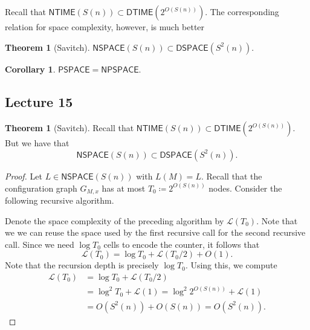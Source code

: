 \documentclass[10pt,letterpaper,cm]{nupset}
\theoremstyle{definition}
\theoremstyle{theorem}
\newtheorem{theorem}[definition]{Theorem}
\newtheorem{corollary}[definition]{Corollary}
\theoremstyle{remark}
\newcommand{\1}{\mathbf{1}}
\newcommand{\0}{\vec 0}
\begin{document}
\smallskip

Recall that $\mathsf{NTIME}(S(n)) \subset \mathsf{DTIME}(2^{O(S(n))})$. The corresponding relation for space complexity, however, is much better

\begin{theorem}[Savitch]
 $\mathsf{NSPACE}(S(n)) \subset \mathsf{DSPACE}(S^2(n))$.
\end{theorem}

\begin{corollary}
$\mathsf{PSPACE} = \mathsf{NPSPACE}$.
\end{corollary}

\subsection{Lecture 15}

\begin{theorem}[Savitch]
Recall that $\mathsf{NTIME}(S(n)) \subset \mathsf{DTIME}(2^{O(S(n))})$. But we have that $$\mathsf{NSPACE}(S(n)) \subset \mathsf{DSPACE}(S^2(n)).$$
\end{theorem}
\begin{proof}
Let $L \in \mathsf{NSPACE}(S(n)) $ with $L(M) = L$. Recall that the configuration graph $G_{M,x}$ has at most $T_0\coloneqq 2^{O(S(n))}$ nodes. Consider the following recursive algorithm.

\smallskip

\begin{algorithm}[H]
   {}
\end{algorithm}


Denote the space complexity of the preceding algorithm by $\mathcal{L}(T_0)$. Note that we we can reuse the space used by the first recursive call for the second recursive call. Since we need $\log{T_0}$ cells to encode the counter, it follows that
$$  \mathcal{L}(T_0) = \log{T_0} + \mathcal{L}(T_0/2) + O(1) .   $$   Note that the recursion depth is precisely $\log{T_0}$. Using this, we compute
\begin{align*}  \mathcal{L}(T_0)  & =    \log{T_0} + \mathcal{L}(T_0/2) 
\\ & = \log^2{T_0} + \mathcal{L}(1) =  \log^2{2^{O(S(n))}} + \mathcal{L}(1) 
\\ & = O(S^2(n)) + O(S(n)) = O(S^2(n))  .
\end{align*}
\end{proof}
\end{document}
